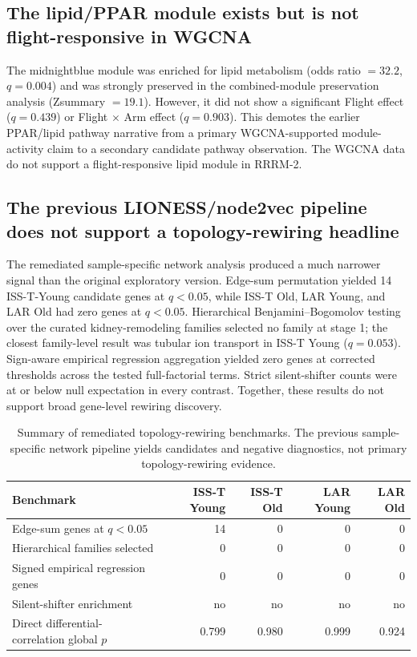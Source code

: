 \documentclass[11pt]{article}
\begin{document}
\subsection{The lipid/PPAR module exists but is not flight-responsive in WGCNA}

The midnightblue module was enriched for lipid metabolism (odds ratio $=32.2$, $q=0.004$) and was strongly preserved in the combined-module preservation analysis (Zsummary $=19.1$). However, it did not show a significant Flight effect ($q=0.439$) or Flight $\times$ Arm effect ($q=0.903$). This demotes the earlier PPAR/lipid pathway narrative from a primary WGCNA-supported module-activity claim to a secondary candidate pathway observation. The WGCNA data do not support a flight-responsive lipid module in RRRM-2.

\subsection{The previous LIONESS/node2vec pipeline does not support a topology-rewiring headline}

The remediated sample-specific network analysis produced a much narrower signal than the original exploratory version. Edge-sum permutation yielded 14 ISS-T-Young candidate genes at $q<0.05$, while ISS-T Old, LAR Young, and LAR Old had zero genes at $q<0.05$. Hierarchical Benjamini--Bogomolov testing over the curated kidney-remodeling families selected no family at stage 1; the closest family-level result was tubular ion transport in ISS-T Young ($q=0.053$). Sign-aware empirical regression aggregation yielded zero genes at corrected thresholds across the tested full-factorial terms. Strict silent-shifter counts were at or below null expectation in every contrast. Together, these results do not support broad gene-level rewiring discovery.

\begin{table}[h]
\centering\small
\begin{tabular}{lrrrr}
\toprule
Benchmark & ISS-T Young & ISS-T Old & LAR Young & LAR Old \\
\midrule
Edge-sum genes at $q<0.05$ & 14 & 0 & 0 & 0 \\
Hierarchical families selected & 0 & 0 & 0 & 0 \\
Signed empirical regression genes & 0 & 0 & 0 & 0 \\
Silent-shifter enrichment & no & no & no & no \\
Direct differential-correlation global $p$ & 0.799 & 0.980 & 0.999 & 0.924 \\
\bottomrule
\end{tabular}
\caption{Summary of remediated topology-rewiring benchmarks. The previous sample-specific network pipeline yields candidates and negative diagnostics, not primary topology-rewiring evidence.}
\label{tab:topology_benchmarks}
\end{table}
\end{document}
